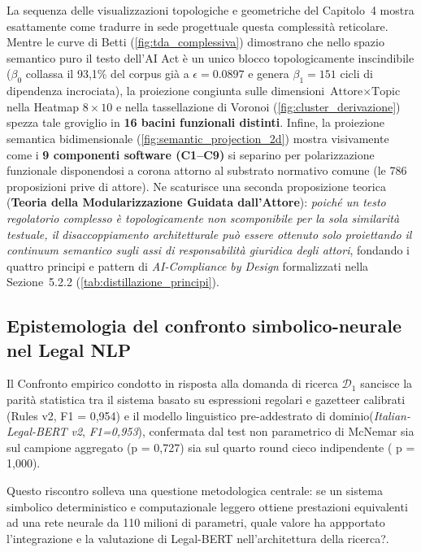 \documentclass[12pt,a4paper,oneside]{report}
\begin{document}
La sequenza delle visualizzazioni topologiche e geometriche del Capitolo~4 mostra esattamente come tradurre in sede progettuale questa complessità reticolare. Mentre le curve di Betti (\cref{fig:tda_complessiva}) dimostrano che nello spazio semantico puro il testo dell'AI Act è un unico blocco topologicamente inscindibile ($\beta_0$ collassa il 93,1\% del corpus già a $\epsilon = \num{0,0897}$ e genera $\beta_1 = 151$ cicli di dipendenza incrociata), la proiezione congiunta sulle dimensioni $\text{Attore} \times \text{Topic}$ nella Heatmap $8 \times 10$ e nella tassellazione di Voronoi (\cref{fig:cluster_derivazione}) spezza tale groviglio in \textbf{16 bacini funzionali distinti}. Infine, la proiezione semantica bidimensionale (\cref{fig:semantic_projection_2d}) mostra visivamente come i \textbf{9 componenti software (C1--C9)} si separino per polarizzazione funzionale disponendosi a corona attorno al substrato normativo comune (le 786 proposizioni prive di attore). Ne scaturisce una seconda proposizione teorica (\textbf{Teoria della Modularizzazione Guidata dall'Attore}): \emph{poiché un testo regolatorio complesso è topologicamente non scomponibile per la sola similarità testuale, il disaccoppiamento architetturale può essere ottenuto solo proiettando il continuum semantico sugli assi di responsabilità giuridica degli attori}, fondando i quattro principi e pattern di \emph{AI-Compliance by Design} formalizzati nella Sezione~5.2.2 (\cref{tab:distillazione_principi}).


\subsection{Epistemologia del confronto simbolico-neurale nel Legal NLP}
Il Confronto empirico condotto in risposta alla domanda di ricerca {$\mathcal{D}_1$} sancisce la parità statistica tra il sistema basato su espressioni regolari e gazetteer calibrati (Rules v2, F1 = 0,954) e il modello linguistico pre-addestrato di dominio(\textit{Italian-Legal-BERT v2}, \textit{F1=0,953}), confermata dal test non parametrico di McNemar sia sul campione aggregato (p = 0,727) sia sul quarto round cieco indipendente ( p = 1,000).

Questo riscontro solleva una questione metodologica centrale: se un sistema simbolico deterministico e computazionale leggero ottiene prestazioni equivalenti ad una rete neurale da 110 milioni di parametri, quale valore ha appportato l'integrazione e la valutazione di Legal-BERT nell'architettura della ricerca?.
\end{document}
